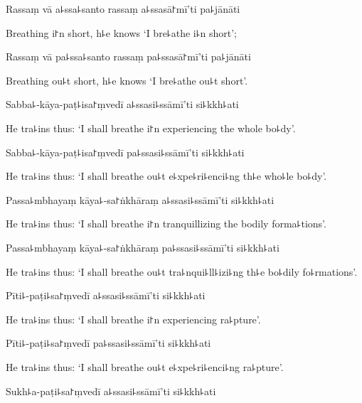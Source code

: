 Rassaṃ vā a꜕ssa꜕santo rassaṃ a꜕ssasā꜓mī'ti pa꜕jānāti

\begin{english}
  Breathing i꜓n short, h꜕e knows `I bre꜕athe i꜕n short';
\end{english}

Rassaṃ vā pa꜕ssa꜕santo rassaṃ pa꜕ssasā꜓mī'ti pa꜕jānāti

\begin{english}
  Breathing ou꜕t short, h꜕e knows `I bre꜕athe ou꜕t short'.
\end{english}

Sabba꜕-kāya-paṭ꜕isa꜓ṃvedī a꜕ssasi꜕ssāmī'ti si꜕kkh꜕ati

\begin{english}
  He tra꜕ins thus: `I shall breathe i꜓n experiencing the whole bo꜕dy'.
\end{english}

Sabba꜕-kāya-paṭ꜕isa꜓ṃvedī pa꜕ssasi꜕ssāmī'ti si꜕kkh꜕ati

\begin{english}
  He tra꜕ins thus: `I shall breathe ou꜕t e꜕xpe꜕ri꜕enci꜕ng th꜕e who꜕le bo꜕dy'.
\end{english}

Passa꜕mbhayaṃ kāya꜕-sa꜓ṅkhāraṃ a꜕ssasi꜕ssāmī'ti si꜕kkh꜕ati

\begin{english}
  He tra꜕ins thus: `I shall breathe i꜓n tranquillizing the bodily forma꜕tions'.
\end{english}

Passa꜕mbhayaṃ kāya꜕-sa꜓ṅkhāraṃ pa꜕ssasi꜕ssāmī'ti si꜕kkh꜕ati

\begin{english}
  He tra꜕ins thus: `I shall breathe ou꜕t tra꜕nqui꜕ll꜕izi꜕ng th꜕e bo꜕dily fo꜕rmations'.
\end{english}

Pīti꜕-paṭi꜕sa꜓ṃvedī a꜕ssasi꜕ssāmī'ti si꜕kkh꜕ati

\begin{english}
  He tra꜕ins thus: `I shall breathe i꜓n experiencing ra꜕pture'.
\end{english}

Pīti꜕-paṭi꜕sa꜓ṃvedī pa꜕ssasi꜕ssāmī'ti si꜕kkh꜕ati

\begin{english}
  He tra꜕ins thus: `I shall breathe ou꜕t e꜕xpe꜕ri꜕enci꜕ng ra꜕pture'.
\end{english}

Sukh꜕a-paṭi꜕sa꜓ṃvedī a꜕ssasi꜕ssāmī'ti si꜕kkh꜕ati

